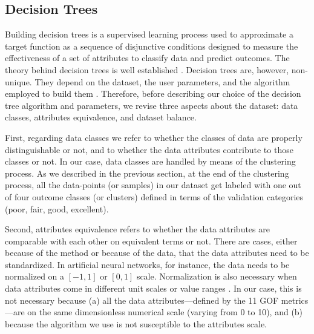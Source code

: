 
\subsection{Decision Trees}
\label{sec:decision-tree}

Building decision trees is a supervised learning process used to approximate a target function as a sequence of disjunctive conditions designed to measure the effectiveness of a set of attributes to classify data and predict outcomes. The theory behind decision trees is well established \citep[e.g.,][]{Quinlan_1986_ML, Quinlan_1993_Book, Mitchell_1997_Book}. 
Decision trees are, however, non-unique. They depend on the dataset, the user parameters, and the algorithm employed to build them \citep{Murthy_1998_DMKD}. Therefore, before describing our choice of the decision tree algorithm and parameters, we revise three aspects about the dataset: data classes, attributes equivalence, and dataset balance.

First, regarding data classes we refer to whether the classes of data are properly distinguishable or not, and to whether the data attributes contribute to those classes or not. In our case, data classes are handled by means of the clustering process. As we described in the previous section, at the end of the clustering process, all the data-points (or samples) in our dataset get labeled with one out of four outcome classes (or clusters) defined in terms of the validation categories (poor, fair, good, excellent).

Second, attributes equivalence refers to whether the data attributes are comparable with each other on equivalent terms or not. There are cases, either because of the method or because of the data, that the data attributes need to be standardized. In artificial neural networks, for instance, the data needs to be normalized on a $[-1,1]$ or $[0,1]$ scale. Normalization is also necessary when data attributes come in different unit scales or value ranges \citep[e.g.,][]{Wu_2010_JH}. In our case, this is not necessary because (a) all the data attributes---defined by the 11 GOF metrics---are on the same dimensionless numerical scale (varying from 0 to 10), and (b) because the algorithm we use is not susceptible to the attributes scale.

